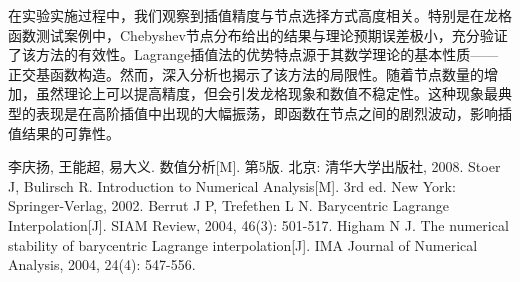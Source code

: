 \documentclass{joulabreport}
\begin{document}
在实验实施过程中，我们观察到插值精度与节点选择方式高度相关。特别是在龙格函数测试案例中，Chebyshev节点分布给出的结果与理论预期误差极小，充分验证了该方法的有效性。Lagrange插值法的优势特点源于其数学理论的基本性质——正交基函数构造。然而，深入分析也揭示了该方法的局限性。随着节点数量的增加，虽然理论上可以提高精度，但会引发龙格现象和数值不稳定性。这种现象最典型的表现是在高阶插值中出现的大幅振荡，即函数在节点之间的剧烈波动，影响插值结果的可靠性。

\begin{thebibliography}{4}
 李庆扬, 王能超, 易大义. 数值分析[M]. 第5版. 北京: 清华大学出版社, 2008.
 Stoer J, Bulirsch R. Introduction to Numerical Analysis[M]. 3rd ed. New York: Springer-Verlag, 2002.
 Berrut J P, Trefethen L N. Barycentric Lagrange Interpolation[J]. SIAM Review, 2004, 46(3): 501-517.
 Higham N J. The numerical stability of barycentric Lagrange interpolation[J]. IMA Journal of Numerical Analysis, 2004, 24(4): 547-556.
\end{thebibliography}
\end{document}
